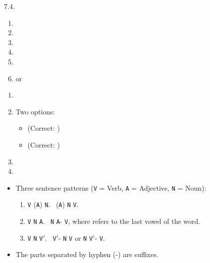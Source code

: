 \begin{refsection}
\begin{practiceproblemsolution}{7.4. \langnameBeja}
\begin{solutions}[label=Solution 7.4\alph*]
    \item
    \begin{enumerate}[resume]
        \item {}
        \item {}
        \item {}
        \item {}
        \item {}
        \item {} or 
    \end{enumerate}
    \pagebreak
    \item
    \begin{enumerate}[resume]
        \item {}
        \item Two options:
        \begin{itemize}

            \item {} (Correct: )
            \item {} (Correct: )
        \end{itemize}
        \item {}
        \item {}
    \end{enumerate}
\end{solutions}

\begin{itemize}
    \item Three sentence patterns (\texttt{V} = Verb, \texttt{A} = Adjective, \texttt{N} = Noun):
    \begin{enumerate}
        \item {} \texttt{V}  (\texttt{A}) \texttt{N}. \Rightarrow\ (\texttt{A}) \texttt{N} \texttt{V}.
        \item {} \texttt{V}  \texttt{N}  \texttt{A}. \Rightarrow\ \texttt{N} \texttt{A}- \texttt{V}, where  refers to the last vowel of the word.
        \item {} \texttt{V}  \texttt{N}  \texttt{V}$′$. \Rightarrow\ \texttt{V}$′$- \texttt{N} \texttt{V} or \texttt{N} \texttt{V}$′$- \texttt{V}.
    \end{enumerate}
    \item The parts separated by hyphen (-) are suffixes.
\end{itemize}
\end{practiceproblemsolution}


\end{refsection}
